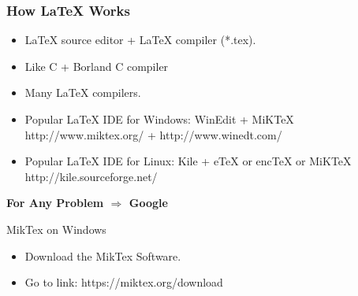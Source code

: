 \documentclass [9pt] {beamer}
\begin{document}
\begin{frame}\frametitle{How LaTeX Works}
\rm
\fontsize{9pt}{11pt}\selectfont
\begin{itemize}
\fontsize{8pt}{10pt}\selectfont

\item LaTeX source editor + LaTeX compiler (*.tex).\\[.30cm]

\item Like C + Borland C compiler\\[.30cm]

\item Many LaTeX compilers.\\[.30cm]
\item Popular LaTeX IDE for Windows:
 \textcolor[rgb]{0.98,0.00,0.00}{WinEdit + MiKTeX}\\
  http://www.miktex.org/ + http://www.winedt.com/\\[.30cm]
\item Popular LaTeX IDE for Linux:
\textcolor[rgb]{0.98,0.00,0.00}{Kile + eTeX or encTeX or MiKTeX}\\
http://kile.sourceforge.net/
\end{itemize}

\begin{center}
\Huge\textcolor[rgb]{0.98,0.00,0.00}{\textbf{For Any Problem $\Longrightarrow$ Google}}
\end{center}
\end{frame}

%
%
\begin{frame}{MikTex on Windows}%
  \begin{itemize}
  \item {Download the MikTex Software.}
  \item Go to link: https://miktex.org/download 
    
  \end{itemize}
\begin{figure}
\end{figure}
\end{frame}
\end{document}
